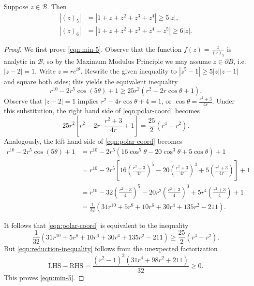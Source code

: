 \documentclass[10pt,a4paper]{amsart}
\newcommand{\calB}{\mathcal B}
\begin{document}
\begin{prop}\label{prop:ineq-smallcases}
	Suppose $z\in \calB$.  Then
	\begin{align}
		|(z)_5| &= |1+z+z^2+z^3+z^4| \geq 5|z|,\label{eqn:min-5}\\
		|(z)_6| &= |1+z+z^2+z^3+z^4+z^5| \geq 6|z|.\label{eqn:min-6}
	\end{align}
\end{prop}

\begin{proof}
	We first prove \eqref{eqn:min-5}.  Observe that the function $f(z) = \tfrac{z}{(z)_5}$ is analytic in $\calB$, so by the Maximum Modulus Principle we may assume $z\in\partial B$, i.e. $|z-2| = 1$.  Write $z = re^{i\theta}$.  Rewrite the given inequality to $|z^5 - 1| \geq 5|z| |z-1|$ and square both sides; this yields the equivalent inequality
	\begin{equation}\label{eqn:polar-coord}
		r^{10} - 2r^5\cos(5\theta) + 1 \geq 25r^2(r^2 - 2r\cos\theta + 1).
	\end{equation}
	Observe that $|z-2| = 1$ implies $r^2 - 4r\cos\theta + 4 = 1$, or $\cos\theta = \frac{r^2+3}{4r}$.  Under this substitution, the right hand side of \eqref{eqn:polar-coord} becomes
	\[
	25r^2\left[r^2 - 2r\cdot \frac{r^2+3}{4r} + 1\right] = \frac{25}2(r^4 - r^2).
	\]
	Analogously, the left hand side of \eqref{eqn:polar-coord} becomes
	\begin{align*}
		r^{10} - 2r^5\cos(5\theta) + 1 &= r^{10} - 2r^5\left(16\cos^5\theta - 20\cos^3\theta + 5\cos\theta\right) + 1\\
		&= r^{10} - 2r^5\left[16\left(\frac{r^2+3}{4r}\right)^5 - 20\left(\frac{r^2+3}{4r}\right)^3 + 5\left(\frac{r^2+3}{4r}\right)\right] + 1\\
		&= r^{10} - 32\left(\frac{r^2+3}4\right)^5 - 20r^2\left(\frac{r^2+3}{4}\right)^3 + 5r^4\left(\frac{r^2+3}4\right)+1\\
		&= \frac1{32}(31r^{10} + 5r^8 + 10r^6 + 30r^4 + 135r^2 - 211).
	\end{align*}
	
	It follows that \eqref{eqn:polar-coord} is equivalent to the inequality 
	\begin{equation}\label{eqn:reduction-inequality}
		\frac1{32}(31r^{10} + 5r^8 + 10r^6 + 30r^4 + 135r^2 - 211) \geq \frac{25}2(r^4 - r^2).
	\end{equation}
	But \eqref{eqn:reduction-inequality} follows from the unexpected factorization
	\[
	\text{LHS} - \text{RHS} = \frac{(r^2-1)^3(31r^4 + 98r^2 + 211)}{32} \geq 0.
	\]
	This proves \eqref{eqn:min-5}.
	

\end{proof}
\end{document}
